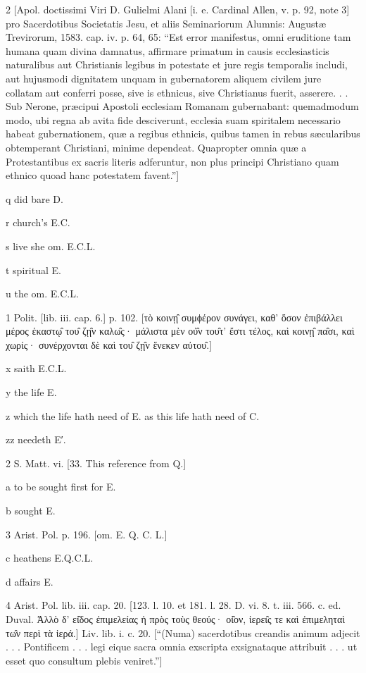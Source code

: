 2
[Apol. doctissimi Viri D. Gulielmi Alani [i. e. Cardinal Allen, v. p. 92, note 3] pro Sacerdotibus Societatis Jesu, et aliis Seminariorum Alumnis: Augustæ Trevirorum, 1583. cap. iv. p. 64, 65: “Est error manifestus, omni eruditione tam humana quam divina damnatus, affirmare primatum in causis ecclesiasticis naturalibus aut Christianis legibus in potestate et jure regis temporalis includi, aut hujusmodi dignitatem unquam in gubernatorem aliquem civilem jure collatam aut conferri posse, sive is ethnicus, sive Christianus fuerit, asserere. . . Sub Nerone, præcipui Apostoli ecclesiam Romanam gubernabant: quemadmodum modo, ubi regna ab avita fide desciverunt, ecclesia suam spiritalem necessario habeat gubernationem, quæ a regibus ethnicis, quibus tamen in rebus sæcularibus obtemperant Christiani, minime dependeat. Quapropter omnia quæ a Protestantibus ex sacris literis adferuntur, non plus principi Christiano quam ethnico quoad hanc potestatem favent.”]

q
did bare D.

r
church’s E.C.

s
live she om. E.C.L.

t
spiritual E.

u
the om. E.C.L.

1
Polit. [lib. iii. cap. 6.] p. 102. [τὸ κοινῃ̑ συμϕέρον συνάγει, καθ’ ὅσον ἐπιβάλλει μέρος ἑκαστῳ̑ του̑ ζῃ̑ν καλω̑ς· μάλιστα μὲν οὐ̑ν του̑τ’ ἔστι τέλος, καὶ κοινῃ̑ πα̑σι, καὶ χωρίς· συνέρχονται δὲ καὶ του̑ ζῃ̑ν ἕνεκεν αὐτου̑.]

x
saith E.C.L.

y
the life E.

z
which the life hath need of E. as this life hath need of C.

zz
needeth E′.

2
S. Matt. vi. [33. This reference from Q.]

a
to be sought first for E.

b
sought E.

3
Arist. Pol. p. 196. [om. E. Q. C. L.]

c
heathens E.Q.C.L.

d
affairs E.

4
Arist. Pol. lib. iii. cap. 20. [123. l. 10. et 181. l. 28. D. vi. 8. t. iii. 566. c. ed. Duval. Ἀλλὸ δ’ εἰ̑δος ἐπιμελείας ἡ πρὸς τοὺς θεούς· οἱ̑ον, ἱερει̑ς τε καὶ ἐπιμεληταὶ τω̑ν περὶ τὰ ἱερά.] Liv. lib. i. c. 20. [“(Numa) sacerdotibus creandis animum adjecit . . . Pontificem . . . legi eique sacra omnia exscripta exsignataque attribuit . . . ut esset quo consultum plebis veniret.”]

